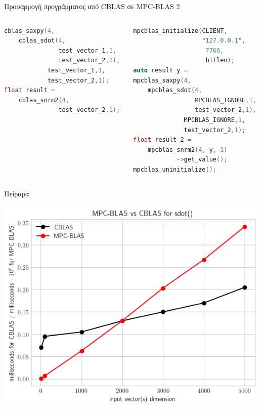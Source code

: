 \documentclass[10pt]{beamer}
\begin{document}
    \begin{frame}[fragile]{Προσαρμογή προγράμματος από CBLAS σε MPC-BLAS 2}
        \begin{columns}[c]
            \begin{column}{.48\textwidth}
                \begin{block}{}
                    \begin{lstlisting}[firstnumber=1, xleftmargin=5pt, basicstyle=\footnotesize, language=C++]
cblas_saxpy(4,
    cblas_sdot(4,
               test_vector_1,1,
               test_vector_2,1),
            test_vector_1,1,
            test_vector_2,1);
float result =
    cblas_snrm2(4,
               test_vector_2,1);
                    \end{lstlisting}
                \end{block}
            \end{column}
            \hfill
            \begin{column}{.48\textwidth}
                \begin{block}{}
                    \begin{lstlisting}[firstnumber=1, xleftmargin=5pt, basicstyle=\footnotesize, language=C++]
mpcblas_initialize(CLIENT,
                   "127.0.0.1",
                    7766,
                    bitlen);
auto result y =
mpcblas_saxpy(4,
    mpcblas_sdot(4,
                 MPCBLAS_IGNORE,1,
                 test_vector_2,1),
              MPCBLAS_IGNORE,1,
              test_vector_2,1);
float result_2 =
    mpcblas_snrm2(4, y, 1)
            ->get_value();
mpcblas_uninitialize();
                    \end{lstlisting}
                \end{block}
            \end{column}%
        \end{columns}
    \end{frame}

    \begin{frame}[fragile, c]{Πείραμα}
        \begin{center}
            \includegraphics[scale=0.7]{./images/mpc-blas-timings-graph}
        \end{center}
    \end{frame}
\end{document}
